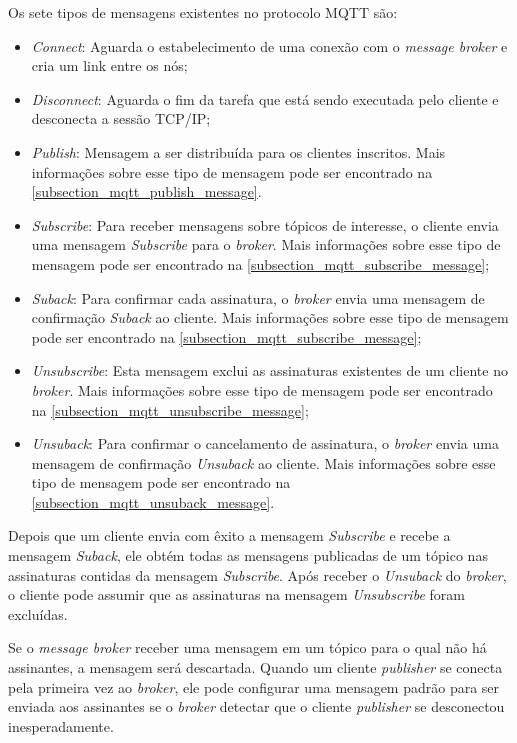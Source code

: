 Os sete tipos de mensagens existentes no protocolo MQTT são:
\begin{itemize}
	\item \textit{Connect}: Aguarda o estabelecimento de uma conexão com o \textit{message broker} e cria um link entre os nós;
	\item \textit{Disconnect}: Aguarda o fim da tarefa que está sendo executada pelo cliente e desconecta a sessão TCP/IP;
	\item \textit{Publish}: Mensagem a ser distribuída para os clientes inscritos. Mais informações sobre esse tipo de mensagem pode ser encontrado na \autoref{subsection_mqtt_publish_message}.
	\item \textit{Subscribe}: Para receber mensagens sobre tópicos de interesse, o cliente envia uma mensagem \textit{Subscribe} para o \textit{broker}. Mais informações sobre esse tipo de mensagem pode ser encontrado na \autoref{subsection_mqtt_subscribe_message};
	\item \textit{Suback}: Para confirmar cada assinatura, o \textit{broker} envia uma mensagem de confirmação \textit{Suback} ao cliente. Mais informações sobre esse tipo de mensagem pode ser encontrado na \autoref{subsection_mqtt_subscribe_message};
	\item \textit{Unsubscribe}: Esta mensagem exclui as assinaturas existentes de um cliente no \textit{broker}. Mais informações sobre esse tipo de mensagem pode ser encontrado na \autoref{subsection_mqtt_unsubscribe_message};
	\item \textit{Unsuback}: Para confirmar o cancelamento de assinatura, o \textit{broker} envia uma mensagem de confirmação \textit{Unsuback} ao cliente. Mais informações sobre esse tipo de mensagem pode ser encontrado na \autoref{subsection_mqtt_unsuback_message}.
\end{itemize}

Depois que um cliente envia com êxito a mensagem \textit{Subscribe} e recebe a mensagem \textit{Suback}, ele obtém todas as mensagens publicadas de um tópico nas assinaturas contidas da mensagem \textit{Subscribe}. Após receber o \textit{Unsuback} do \textit{broker}, o cliente pode assumir que as assinaturas na mensagem \textit{Unsubscribe} foram excluídas.

Se o \textit{message broker} receber uma mensagem em um tópico para o qual não há assinantes, a mensagem será descartada. Quando um cliente \textit{publisher} se conecta pela primeira vez ao \textit{broker}, ele pode configurar uma mensagem padrão para ser enviada aos assinantes se o \textit{broker} detectar que o cliente \textit{publisher} se desconectou inesperadamente.

